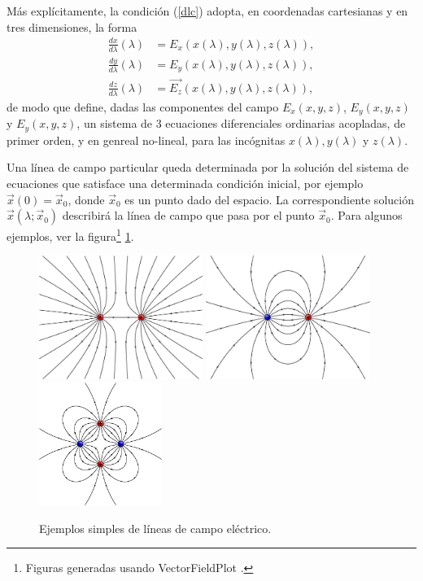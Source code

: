 Más explícitamente, la condición (\ref{dlc}) adopta, en coordenadas cartesianas y en tres dimensiones, la forma 
\begin{align}
\frac{dx}{d\lambda}(\lambda) &= {E_x}(x(\lambda),y(\lambda),z(\lambda)), \\
\frac{dy}{d\lambda}(\lambda) &= {E_y}(x(\lambda),y(\lambda),z(\lambda)),\\
\frac{dz}{d\lambda}(\lambda) &= \vec{E_z}(x(\lambda),y(\lambda),z(\lambda)),
\end{align}
de modo que define, dadas las componentes del campo $E_x(x,y,z)$, $E_y(x,y,z)$ y $E_y(x,y,z)$, un sistema de 3 ecuaciones diferenciales ordinarias acopladas, de primer orden, y en genreal no-lineal, para las incógnitas $x(\lambda),y(\lambda)$ y $z(\lambda)$.

Una línea de campo particular queda determinada por la solución del sistema de ecuaciones que satisface una determinada condición inicial, por ejemplo $\vec{x}(0)=\vec{x}_0$, donde $\vec{x}_0$ es un punto dado del espacio. La correspondiente solución $\vec{x}(\lambda;\vec{x}_0)$ describirá la línea de campo que pasa por el punto $\vec{x}_0$. Para algunos ejemplos, ver la figura\footnote{Figuras generadas usando VectorFieldPlot \cite{VFP}.} \ref{fig-E}.

\begin{center}
\begin{figure}[H]
\centerline{\includegraphics[height=4cm]{fig/fig-E-01.pdf}\hfill 
\includegraphics[height=4cm]{fig/fig-E-02.pdf}\hfill
\includegraphics[height=4cm]{fig/fig-E-03.pdf}}
\caption{Ejemplos simples de líneas de campo eléctrico.}
\label{fig-E}
\end{figure}
\end{center}
